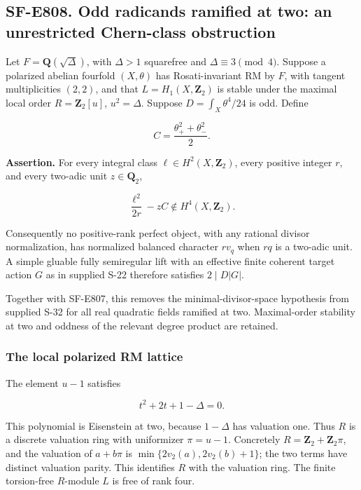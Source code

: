 \subsection{SF-E808. Odd radicands ramified at two: an unrestricted
Chern-class
obstruction}\label{SF-E808}

Let \(F=\mathbf Q(\sqrt{\Delta})\), with \(\Delta>1\) squarefree and
\(\Delta\equiv3\pmod4\). Suppose a polarized abelian fourfold
\((X,\theta)\) has Rosati-invariant RM by \(F\), with tangent
multiplicities \((2,2)\), and that \(L=H_1(X,\mathbf Z_2)\) is stable
under the maximal local order \(R=\mathbf Z_2[u]\), \(u^2=\Delta\).
Suppose \(D=\int_X\theta^4/24\) is odd. Define

\[
 C=\frac{\theta_+^2+\theta_-^2}{2}.
\]

\textbf{Assertion.} For every integral class
\(\ell\in H^2(X,\mathbf Z_2)\), every positive integer \(r\), and every
two-adic unit \(z\in\mathbf Q_2\),

\[
 \frac{\ell^2}{2r}-zC\notin H^4(X,\mathbf Z_2).
 \tag{E808.1}
\]

Consequently no positive-rank perfect object, with any rational divisor
normalization, has normalized balanced character \(r v_q\) when \(rq\)
is a two-adic unit. A simple gluable fully semiregular lift with an
effective finite coherent target action \(G\) as in supplied S-22
therefore satisfies \(2\mid D|G|\).

Together with SF-E807, this removes the minimal-divisor-space hypothesis
from supplied S-32 for all real quadratic fields ramified at two.
Maximal-order stability at two and oddness of the relevant degree
product are retained.

\subsubsection{The local polarized RM
lattice}\label{the-local-polarized-rm-lattice}

The element \(u-1\) satisfies

\[
 t^2+2t+1-\Delta=0.
\]

This polynomial is Eisenstein at two, because \(1-\Delta\) has valuation
one. Thus \(R\) is a discrete valuation ring with uniformizer
\(\pi=u-1\). Concretely \(R=\mathbf Z_2+\mathbf Z_2\pi\), and the
valuation of \(a+b\pi\) is \(\min\{2v_2(a),2v_2(b)+1\}\); the two terms
have distinct valuation parity. This identifies \(R\) with the valuation
ring. The finite torsion-free \(R\)-module \(L\) is free of rank four.

